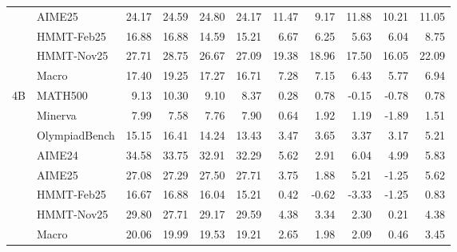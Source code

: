 \begin{table}[h]
\begin{tabular}{llrrrrrrrr|r}
 & AIME25 & 24.17 & 24.59 & 24.80 & 24.17 & 11.47 & 9.17 & 11.88 & 10.21 & 11.05 \\
 & HMMT-Feb25 & 16.88 & 16.88 & 14.59 & 15.21 & 6.67 & 6.25 & 5.63 & 6.04 & 8.75 \\
 & HMMT-Nov25 & 27.71 & 28.75 & 26.67 & 27.09 & 19.38 & 18.96 & 17.50 & 16.05 & 22.09 \\
\cmidrule(lr){2-11}
 & Macro & 17.40 & 19.25 & 17.27 & 16.71 & 7.28 & 7.15 & 6.43 & 5.77 & 6.94 \\
\midrule
4B & MATH500 & 9.13 & 10.30 & 9.10 & 8.37 & 0.28 & 0.78 & -0.15 & -0.78 & 0.78 \\
 & Minerva & 7.99 & 7.58 & 7.76 & 7.90 & 0.64 & 1.92 & 1.19 & -1.89 & 1.51 \\
 & OlympiadBench & 15.15 & 16.41 & 14.24 & 13.43 & 3.47 & 3.65 & 3.37 & 3.17 & 5.21 \\
 & AIME24 & 34.58 & 33.75 & 32.91 & 32.29 & 5.62 & 2.91 & 6.04 & 4.99 & 5.83 \\
 & AIME25 & 27.08 & 27.29 & 27.50 & 27.71 & 3.75 & 1.88 & 5.21 & -1.25 & 5.62 \\
 & HMMT-Feb25 & 16.67 & 16.88 & 16.04 & 15.21 & 0.42 & -0.62 & -3.33 & -1.25 & 0.83 \\
 & HMMT-Nov25 & 29.80 & 27.71 & 29.17 & 29.59 & 4.38 & 3.34 & 2.30 & 0.21 & 4.38 \\
\cmidrule(lr){2-11}
 & Macro & 20.06 & 19.99 & 19.53 & 19.21 & 2.65 & 1.98 & 2.09 & 0.46 & 3.45 \\
\bottomrule
\end{tabular}
\end{table}
